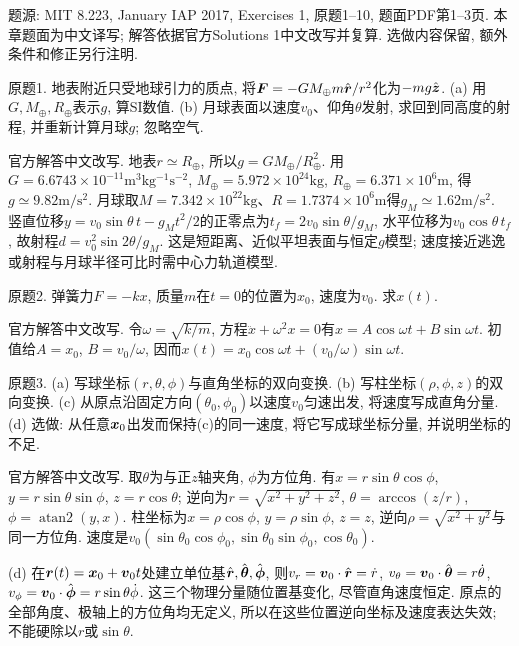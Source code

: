 题源: MIT 8.223, January IAP 2017, Exercises 1, 原题1--10, 题面PDF第1--3页. 本章题面为中文译写; 解答依据官方Solutions 1中文改写并复算. 选做内容保留, 额外条件和修正另行注明.

\begin{exercise}
原题1. 地表附近只受地球引力的质点, 将$\boldsymbol{F}=-GM_\oplus m\hat{\boldsymbol{r}}/r^2$化为$-mg\hat{\boldsymbol{z}}$. (a) 用$G,M_\oplus,R_\oplus$表示$g$, 算SI数值. (b) 月球表面以速度$v_0$、仰角$\theta$发射, 求回到同高度的射程, 并重新计算月球$g$; 忽略空气.
\end{exercise}
\begin{solution}
官方解答中文改写. 地表$r\simeq R_\oplus$, 所以$g=GM_\oplus/R_\oplus^2$. 用$G=6.6743\times10^{-11}\mathrm{m^3kg^{-1}s^{-2}}$, $M_\oplus=5.972\times10^{24}\mathrm{kg}$, $R_\oplus=6.371\times10^6\mathrm m$, 得$g\simeq9.82\mathrm{m/s^2}$. 月球取$M=7.342\times10^{22}\mathrm{kg}$、$R=1.7374\times10^6\mathrm m$得$g_M\simeq1.62\mathrm{m/s^2}$. 竖直位移$y=v_0\sin\theta\,t-g_Mt^2/2$的正零点为$t_f=2v_0\sin\theta/g_M$, 水平位移为$v_0\cos\theta\,t_f$, 故射程$d=v_0^2\sin2\theta/g_M$. 这是短距离、近似平坦表面与恒定$g$模型; 速度接近逃逸或射程与月球半径可比时需中心力轨道模型.
\end{solution}

\begin{exercise}
原题2. 弹簧力$F=-kx$, 质量$m$在$t=0$的位置为$x_0$, 速度为$v_0$. 求$x(t)$.
\end{exercise}
\begin{solution}
官方解答中文改写. 令$\omega=\sqrt{k/m}$, 方程$\ddot x+\omega^2x=0$有$x=A\cos\omega t+B\sin\omega t$. 初值给$A=x_0$, $B=v_0/\omega$, 因而$x(t)=x_0\cos\omega t+(v_0/\omega)\sin\omega t$.
\end{solution}

\begin{exercise}
原题3. (a) 写球坐标$(r,\theta,\phi)$与直角坐标的双向变换. (b) 写柱坐标$(\rho,\phi,z)$的双向变换. (c) 从原点沿固定方向$(\theta_0,\phi_0)$以速度$v_0$匀速出发, 将速度写成直角分量. (d) 选做: 从任意$\boldsymbol{x}_0$出发而保持(c)的同一速度, 将它写成球坐标分量, 并说明坐标的不足.
\end{exercise}
\begin{solution}
官方解答中文改写. 取$\theta$为与正$z$轴夹角, $\phi$为方位角. 有$x=r\sin\theta\cos\phi$, $y=r\sin\theta\sin\phi$, $z=r\cos\theta$; 逆向为$r=\sqrt{x^2+y^2+z^2}$, $\theta=\arccos(z/r)$, $\phi=\operatorname{atan2}(y,x)$. 柱坐标为$x=\rho\cos\phi$, $y=\rho\sin\phi$, $z=z$, 逆向$\rho=\sqrt{x^2+y^2}$与同一方位角. 速度是$v_0(\sin\theta_0\cos\phi_0,\sin\theta_0\sin\phi_0,\cos\theta_0)$.

(d) 在$\boldsymbol{r}(t)=\boldsymbol{x}_0+\boldsymbol{v}_0t$处建立单位基$\hat{\boldsymbol{r}},\hat{\boldsymbol{\theta}},\hat{\boldsymbol{\phi}}$, 则$v_r=\boldsymbol{v}_0\cdot\hat{\boldsymbol{r}}=\dot r$, $v_\theta=\boldsymbol{v}_0\cdot\hat{\boldsymbol{\theta}}=r\dot\theta$, $v_\phi=\boldsymbol{v}_0\cdot\hat{\boldsymbol{\phi}}=r\sin\theta\dot\phi$. 这三个物理分量随位置基变化, 尽管直角速度恒定. 原点的全部角度、极轴上的方位角均无定义, 所以在这些位置逆向坐标及速度表达失效; 不能硬除以$r$或$\sin\theta$.
\end{solution}


